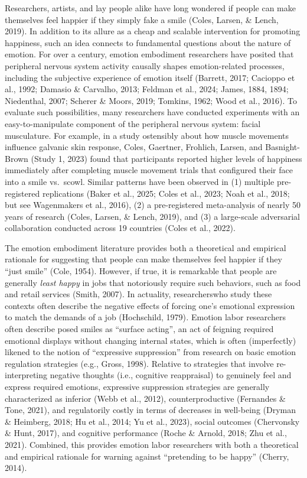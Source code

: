 \documentclass[
  letterpaper,
  DIV=11,
  numbers=noendperiod]{scrartcl}
\begin{document}
Researchers, artists, and lay people alike have long wondered if people
can make themselves feel happier if they simply fake a smile (Coles,
Larsen, \& Lench, 2019). In addition to its allure as a cheap and
scalable intervention for promoting happiness, such an idea connects to
fundamental questions about the nature of emotion. For over a century,
emotion embodiment researchers have posited that peripheral nervous
system activity causally shapes emotion-related processes, including the
subjective experience of emotion itself (Barrett, 2017; Cacioppo et al.,
1992; Damasio \& Carvalho, 2013; Feldman et al., 2024; James, 1884,
1894; Niedenthal, 2007; Scherer \& Moors, 2019; Tomkins, 1962; Wood et
al., 2016). To evaluate such possibilities, many researchers have
conducted experiments with an easy-to-manipulate component of the
peripheral nervous system: facial musculature. For example, in a study
ostensibly about how muscle movements influence galvanic skin response,
Coles, Gaertner, Frohlich, Larsen, and Basnight-Brown (Study 1, 2023)
found that participants reported higher levels of happiness immediately
after completing muscle movement trials that configured their face into
a smile vs.~scowl. Similar patterns have been observed in (1) multiple
pre-registered replications (Baker et al., 2025; Coles et al., 2023;
Noah et al., 2018; but see {Wagenmakers et al.}, 2016), (2) a
pre-registered meta-analysis of nearly 50 years of research (Coles,
Larsen, \& Lench, 2019), and (3) a large-scale adversarial collaboration
conducted across 19 countries ({Coles et al.}, 2022).

The emotion embodiment literature provides both a theoretical and
empirical rationale for suggesting that people can make themselves feel
happier if they ``just smile'' (Cole, 1954). However, if true, it is
remarkable that people are generally \emph{least happy} in jobs that
notoriously require such behaviors, such as food and retail services
(Smith, 2007). In actuality, researcherswho study these contexts often
describe the negative effects of forcing one's emotional expression to
match the demands of a job (Hochschild, 1979)\emph{.} Emotion labor
researchers often describe posed smiles as ``surface acting'', an act of
feigning required emotional displays without changing internal states,
which is often (imperfectly) likened to the notion of ``expressive
suppression'' from research on basic emotion regulation strategies
(e.g., Gross, 1998). Relative to strategies that involve re-interpreting
negative thoughts (i.e., cognitive reappraisal) to genuinely feel and
express required emotions, expressive suppression strategies are
generally characterized as inferior (Webb et al., 2012),
counterproductive (Fernandes \& Tone, 2021), and regulatorily costly in
terms of decreases in well-being (Dryman \& Heimberg, 2018; Hu et al.,
2014; Yu et al., 2023), social outcomes (Chervonsky \& Hunt, 2017), and
cognitive performance (Roche \& Arnold, 2018; Zhu et al., 2021).
Combined, this provides emotion labor researchers with both a
theoretical and empirical rationale for warning against ``pretending to
be happy'' (Cherry, 2014).
\end{document}
